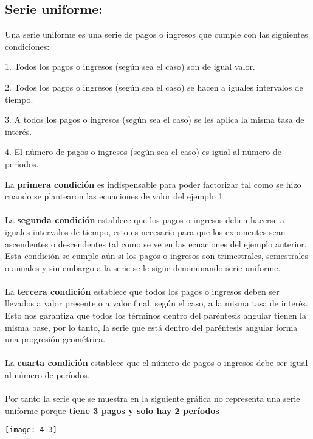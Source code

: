 \subsection{Serie uniforme:}
Una serie uniforme es una serie de pagos o ingresos que cumple con las siguientes condiciones:


\hspace{35}	1. Todos los pagos o ingresos (según sea el caso) son de igual valor.

\hspace{35} 2. Todos los pagos o ingresos (según sea el caso) se hacen a iguales intervalos de tiempo.

\hspace{35} 3. A todos los pagos o ingresos (según sea el caso) se les aplica la misma tasa de interés.

\hspace{35}	4. El número de pagos o ingresos (según sea el caso) es igual al número de períodos.


La \textbf{primera condición} es indispensable para poder factorizar tal como se hizo cuando se plantearon las ecuaciones de valor del ejemplo 1.
\\\\
La \textbf{segunda condición} establece que los pagos o ingresos deben hacerse a iguales intervalos de tiempo, esto es necesario para que los exponentes sean ascendentes o descendentes tal como se ve en las ecuaciones del ejemplo anterior. Esta condición se cumple aún si los pagos o ingresos son trimestrales, semestrales o anuales y sin embargo a la serie se le sigue denominando serie uniforme.
\\\\
La \textbf{tercera condición} establece que todos los pagos o ingresos deben ser llevados a valor presente o a valor final, según el caso, a la misma tasa de interés. Esto nos garantiza que todos los términos dentro del paréntesis angular tienen la misma base, por lo tanto, la serie que está dentro del paréntesis angular forma una progresión geométrica.
\\\\
La \textbf{cuarta condición} establece que el número de pagos o ingresos debe ser igual al número de períodos.
\\\\
Por tanto la serie que se muestra en la siguiente gráfica no representa una serie uniforme porque \textbf{tiene 3 pagos y solo hay 2 períodos}

\begin{center}
	\texttt{[image: 4\_3]}
\end{center}

